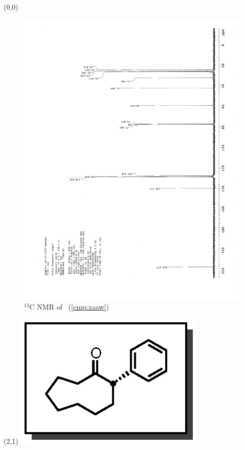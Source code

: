 \clearpage
\begin{textblock}{20}(0,0)
\begin{figure}[htb]
\caption{$^{13}$C NMR of  \CMPxaaw\ (\ref{cmp:xaaw})}
\includegraphics[scale=0.75, trim = 0mm 0mm 0mm 5mm,
clip]{chp_asymmetric/images/nmr/xaawC}
\vspace{-100pt}
\end{figure}
\end{textblock}
\begin{textblock}{1}(2,1)
\includegraphics[scale=0.8, angle=90]{chp_asymmetric/images/xaaw}
\end{textblock}
\clearpage

